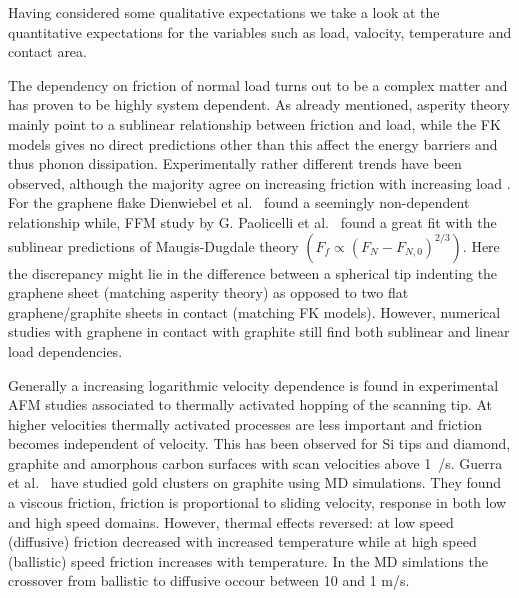 Having considered some qualitative expectations we take a look at the
quantitative expectations for the variables such as load, valocity, temperature
and contact area.

The dependency on friction of normal load turns out to be a complex matter and
has proven to be highly system dependent. As already mentioned, asperity theory
mainly point to a sublinear relationship between friction and load, while the
\acrshort{FK} models gives no direct predictions other than this affect the
energy barriers and thus phonon dissipation. Experimentally rather different
trends have been observed, although the majority agree on increasing friction
with increasing load \cite[p. 200]{gnecco_meyer_2015}. For the graphene flake
Dienwiebel et al.\ \cite{DIENWIEBEL2005197} found a seemingly non-dependent
relationship while, \acrshort{FFM} study by G. Paolicelli et al.\
\cite{Paolicelli_2015} found a great fit with the sublinear predictions of
Maugis-Dugdale theory $(F_f \propto (F_N - F_{N,0})^{2/3})$. Here the discrepancy might lie in the difference between a spherical tip indenting the graphene sheet (matching asperity theory) as opposed to two flat graphene/graphite sheets in contact (matching \acrshort{FK} models). However, numerical studies with graphene in contact with graphite still find both sublinear \cite{bonelli_atomistic_2009} and linear \cite{ma12091425} load dependencies.





Generally a increasing logarithmic velocity dependence is found in experimental \acrshort{AFM} studies  \cite[p. 201]{gnecco_meyer_2015} associated to thermally activated hopping of the scanning tip. At higher velocities thermally activated processes are less important and friction becomes independent of velocity. This has been observed for Si tips and diamond, graphite and amorphous carbon surfaces with scan velocities above \SI{1}{\mu/s}. Guerra et al.\ \cite{Guerra_2010} have studied gold clusters on graphite using \acrshort{MD} simulations. They found a viscous friction, friction is proportional to sliding velocity, response in both low and high speed domains. However, thermal effects reversed: at low speed (diffusive) friction decreased with increased temperature while at high speed (ballistic) speed friction increases with temperature. In the \acrshort{MD} simlations the crossover from ballistic to diffusive occour between 10 and 1 m/s. 

